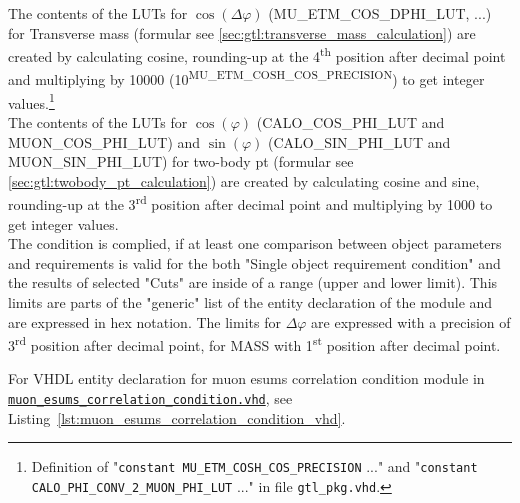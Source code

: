 The contents of the LUTs for $\cos(\Delta\varphi)$ (\small{MU\_ETM\_COS\_DPHI\_LUT}\normalsize, ...) for Transverse mass (formular see \ref{sec:gtl:transverse_mass_calculation}) 
are created by calculating cosine, rounding-up at the 4\textsuperscript{th} 
position after decimal point and multiplying by 10000 (10\textsuperscript{\tiny{MU\_ETM\_COSH\_COS\_PRECISION}}\normalsize) to get integer values.\footnote{Definition of 
"\texttt{constant \small{MU\_ETM\_COSH\_COS\_PRECISION}\normalsize} ..." and "\texttt{constant \small{CALO\_PHI\_CONV\_2\_MUON\_PHI\_LUT}\normalsize} ..." in file \texttt{gtl\_pkg.vhd}.}\\
The contents of the LUTs for $\cos(\varphi)$ (\small{CALO\_COS\_PHI\_LUT and MUON\_COS\_PHI\_LUT}\normalsize) and $\sin(\varphi)$ (\small{CALO\_SIN\_PHI\_LUT and MUON\_SIN\_PHI\_LUT}\normalsize) for two-body pt 
(formular see \ref{sec:gtl:twobody_pt_calculation}) are created by calculating cosine and sine, rounding-up at the 3\textsuperscript{rd} position after decimal point and multiplying by 1000 to get integer values.\\
The condition is complied, if at least one comparison between object parameters and requirements is valid for the both "Single object requirement condition"
and the results of selected "Cuts" are inside of a range (upper and lower limit).
This limits are parts of the "generic" list of the entity declaration of the module and are expressed in hex notation. The limits for $\Delta\varphi$
are expressed with a precision of 3\textsuperscript{rd} position after decimal point, for MASS with 1\textsuperscript{st} position after decimal point.

For VHDL entity declaration for muon esums correlation condition module in \href{https://github.com/cms-l1-globaltrigger/mp7_ugt_legacy/tree/master/firmware/hdl/gt_mp7_core/gtl_fdl_wrapper/gtl/muon_esums_correlation_condition.vhd}{\texttt{muon\_esums\_correlation\_condition.vhd}}, see Listing~\ref{lst:muon_esums_correlation_condition_vhd}.\\


\clearpage

